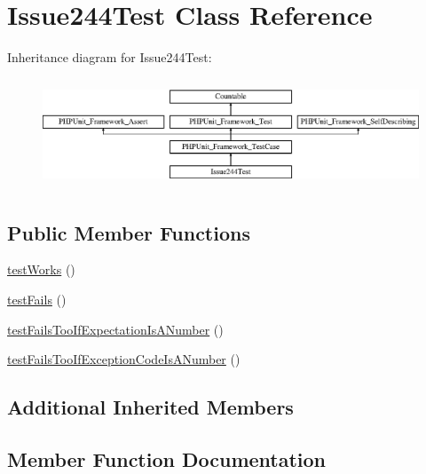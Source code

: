 \hypertarget{class_issue244_test}{}\section{Issue244\+Test Class Reference}
\label{class_issue244_test}
Inheritance diagram for Issue244\+Test\+:\begin{figure}[H]
\begin{center}
\leavevmode
\includegraphics[height=3.303835cm]{class_issue244_test}
\end{center}
\end{figure}
\subsection*{Public Member Functions}
\begin{DoxyCompactItemize}
\item 
\mbox{\hyperlink{class_issue244_test_aeb9d24e964607db886a5e055cc1f626a}{test\+Works}} ()
\item 
\mbox{\hyperlink{class_issue244_test_a07db40ad5ab5468edd07729b973b1ec8}{test\+Fails}} ()
\item 
\mbox{\hyperlink{class_issue244_test_a71f9fb4342f29d3b6e81fa081f75ebd6}{test\+Fails\+Too\+If\+Expectation\+Is\+A\+Number}} ()
\item 
\mbox{\hyperlink{class_issue244_test_a536fa0ae8148c06f5969c0e8d49a0f5b}{test\+Fails\+Too\+If\+Exception\+Code\+Is\+A\+Number}} ()
\end{DoxyCompactItemize}
\subsection*{Additional Inherited Members}


\subsection{Member Function Documentation}
\mbox{\label{class_issue244_test_a07db40ad5ab5468edd07729b973b1ec8}} 

